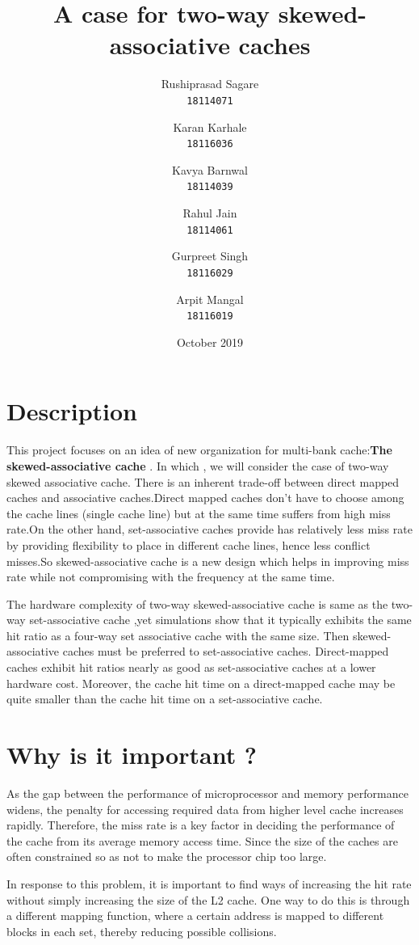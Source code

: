 \documentclass{article}
\title{\Huge A case for two-way skewed-associative caches}
\author{Rushiprasad Sagare\\
  \texttt{18114071}
  \and
  Karan Karhale\\
  \texttt{18116036}
  \and
  Kavya Barnwal\\
  \texttt{18114039}
  \and
  Rahul Jain\\
  \texttt{18114061}
    \and
    Gurpreet Singh\\
    \texttt{18116029}
    \and
    Arpit Mangal\\
    \texttt{18116019}
  }
\date{October 2019}
\begin{document}
\maketitle

\section{Description}
\qquad This project focuses on an idea of new organization for multi-bank
cache:\textbf{The skewed-associative cache} . In which , we will consider the
case of two-way skewed associative cache. There is an inherent trade-off between direct mapped caches and
associative caches.\newline Direct mapped caches don’t have to choose among the
cache lines (single cache line) but at the same time suffers from high
miss rate.On the other hand, set-associative caches provide has
relatively less miss rate by providing flexibility to place in
different cache lines, hence less conflict misses.So skewed-associative
cache is a new design which helps in improving miss rate while not
compromising with the frequency at the same time.

\qquad The hardware complexity of two-way skewed-associative cache is same as
the two-way set-associative cache ,yet simulations show that it
typically exhibits the same hit ratio as a four-way set associative
cache with the same size. Then skewed-associative caches must be
preferred to set-associative caches. Direct-mapped caches exhibit hit
ratios nearly as good as set-associative caches at a lower hardware
cost. Moreover, the cache hit time on a direct-mapped cache may be
quite smaller than the cache hit time on a set-associative cache.

\section{Why is it important ?}
\qquad As the gap between the performance of microprocessor and memory
performance widens, the penalty for accessing required data from higher
level cache increases rapidly. Therefore, the miss rate is a key factor
in deciding the performance of the cache from its average memory access
time. Since the size of the caches are often constrained so as not to
make the processor chip too large.

\qquad In response to this problem, it is important to find ways of
increasing the hit rate without simply increasing the size of the L2
cache. One way to do this is through a different mapping function,
where a certain address is mapped to different blocks in each set,
thereby reducing possible collisions.
\newpage
\end{document}
